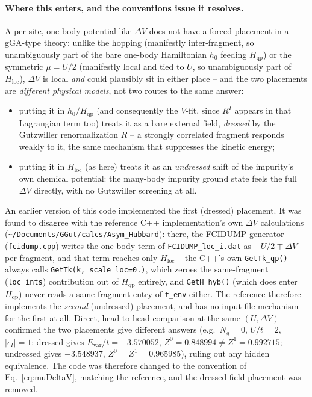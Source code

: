 \documentclass[11pt]{article}
\newcommand{\Ng}{N_{g}}
\newcommand{\Hqp}{H_{\mathrm{qp}}}
\newcommand{\Hloc}{H_{\mathrm{loc}}}
\begin{document}
\paragraph{Where this enters, and the conventions issue it resolves.} A per-site,
one-body potential like $\Delta V$ does not have a forced placement in a gGA-type
theory: unlike the hopping (manifestly inter-fragment, so unambiguously part of the
bare one-body Hamiltonian $h_0$ feeding $\Hqp$) or the symmetric $\mu=U/2$ (manifestly
local and tied to $U$, so unambiguously part of $\Hloc$), $\Delta V$ is local
\emph{and} could plausibly sit in either place -- and the two placements are
\emph{different physical models}, not two routes to the same answer:
\begin{itemize}
  \item putting it in $h_0/\Hqp$ (and consequently the $V$-fit, since $R^I$ appears in
    that Lagrangian term too) treats it as a bare external field, \emph{dressed} by the
    Gutzwiller renormalization $R$ -- a strongly correlated fragment responds weakly to
    it, the same mechanism that suppresses the kinetic energy;
  \item putting it in $\Hloc$ (as here) treats it as an \emph{undressed} shift of the
    impurity's own chemical potential: the many-body impurity ground state feels the
    full $\Delta V$ directly, with no Gutzwiller screening at all.
\end{itemize}
An earlier version of this code implemented the first (dressed) placement. It was
found to disagree with the reference C++ implementation's own $\Delta V$ calculations
(\texttt{\textasciitilde/Documents/GGut/calcs/Asym\_Hubbard}): there, the FCIDUMP
generator (\texttt{fcidump.cpp}) writes the one-body term of \texttt{FCIDUMP\_loc\_i.dat}
as $-U/2\mp\Delta V$ per fragment, and that term reaches only $\Hloc$ -- the C++'s own
\texttt{GetTk\_qp()} always calls \texttt{GetTk(k, scale\_loc=0.)}, which zeroes the
same-fragment (\texttt{loc\_ints}) contribution out of $\Hqp$ entirely, and
\texttt{GetH\_hyb()} (which does enter $\Hqp$) never reads a same-fragment entry of
\texttt{t\_env} either. The reference therefore implements the \emph{second}
(undressed) placement, and has no input-file mechanism for the first at all. Direct,
head-to-head comparison at the same $(U,\Delta V)$ confirmed the two placements give
different answers (e.g.\ $\Ng=0$, $U/t=2$, $\lvert\epsilon_I\rvert=1$: dressed gives
$E_{\mathrm{var}}/t=-3.570052$, $Z^0=0.848994\neq Z^1=0.992715$; undressed gives
$-3.548937$, $Z^0=Z^1=0.965985$), ruling out any hidden equivalence. The code was
therefore changed to the convention of Eq.~\eqref{eq:muDeltaV}, matching the reference,
and the dressed-field placement was removed.
\end{document}
